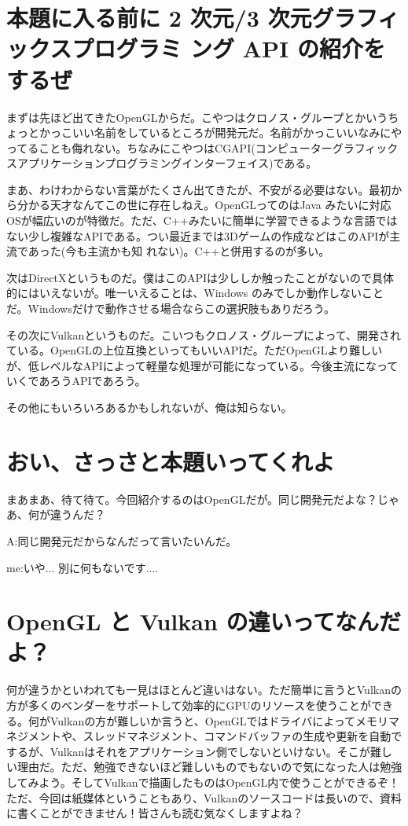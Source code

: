 \documentclass[a4paper,titlepage]{jsarticle}
\begin{document}
\section{本題に入る前に 2 次元/3 次元グラフィックスプログラミ ング API の紹介をするぜ}
まずは先ほど出てきたOpenGLからだ。こやつはクロノス・グループとかいうちょっとかっこいい名前をしているところが開発元だ。名前がかっこいいなみにやってることも侮れない。ちなみにこやつはCGAPI(コンピューターグラフィックスアプリケーションプログラミングインターフェイス)である。 

まあ、わけわからない言葉がたくさん出てきたが、不安がる必要はない。最初から分かる天才なんてこの世に存在しねえ。OpenGLってのはJava みたいに対応OSが幅広いのが特徴だ。ただ、C++みたいに簡単に学習できるような言語ではない少し複雑なAPIである。つい最近までは3Dゲームの作成などはこのAPIが主流であった(今も主流かも知 れない)。C++と併用するのが多い。 

次はDirectXというものだ。僕はこのAPIは少ししか触ったことがないので具体的にはいえないが。唯一いえることは、Windows のみでしか動作しないことだ。Windowsだけで動作させる場合ならこの選択肢もありだろう。 

その次にVulkanというものだ。こいつもクロノス・グループによって、開発されている。OpenGLの上位互換といってもいいAPIだ。ただOpenGLより難しいが、低レベルなAPIによって軽量な処理が可能になっている。今後主流になっていくであろうAPIであろう。 

その他にもいろいろあるかもしれないが、俺は知らない。

\section{おい、さっさと本題いってくれよ}
まあまあ、待て待て。今回紹介するのはOpenGLだが。同じ開発元だよな？じゃあ、何が違うんだ？

 A:同じ開発元だからなんだって言いたいんだ。
 
 me:いや... 別に何もないです....
 
\section{OpenGL と Vulkan の違いってなんだよ？}
何が違うかといわれても一見はほとんど違いはない。ただ簡単に言うとVulkanの方が多くのベンダーをサポートして効率的にGPUのリソースを使うことができる。何がVulkanの方が難しいか言うと、OpenGLではドライバによってメモリマネジメントや、スレッドマネジメント、コマンドバッファの生成や更新を自動でするが、Vulkanはそれをアプリケーション側でしないといけない。そこが難しい理由だ。ただ、勉強できないほど難しいものでもないので気になった人は勉強してみよう。そしてVulkanで描画したものはOpenGL内で使うことができるぞ！ただ、今回は紙媒体ということもあり、Vulkanのソースコードは長いので、資料に書くことができません！皆さんも読む気なくしますよね？
\end{document}
